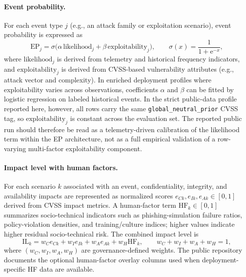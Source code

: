 \documentclass[preprint,12pt]{elsarticle}
\begin{document}
\paragraph{Event probability.}
For each event type $j$ (e.g., an attack family or exploitation scenario), event probability is expressed as
\begin{equation}
  \mathrm{EP}_j =
    \sigma\!\bigl(\alpha\,\mathrm{likelihood}_j + \beta\,\mathrm{exploitability}_j\bigr),
  \qquad
  \sigma(x) = \frac{1}{1+\mathrm{e}^{-x}},
  \label{eq:ep}
\end{equation}
where $\mathrm{likelihood}_j$ is derived from telemetry and historical frequency indicators, and $\mathrm{exploitability}_j$ is derived from CVSS-based vulnerability attributes (e.g., attack vector and complexity). In enriched deployment profiles where exploitability varies across observations, coefficients $\alpha$ and $\beta$ can be fitted by logistic regression on labeled historical events. In the strict public-data profile reported here, however, all rows carry the same \texttt{global\_neutral\_prior} CVSS tag, so $\mathrm{exploitability}_j$ is constant across the evaluation set. The reported public run should therefore be read as a telemetry-driven calibration of the likelihood term within the EP architecture, not as a full empirical validation of a row-varying multi-factor exploitability component.

\paragraph{Impact level with human factors.}
For each scenario $k$ associated with an event, confidentiality, integrity, and availability impacts are represented as normalized scores $e_{Ck}, e_{Ik}, e_{Ak} \in [0,1]$ derived from CVSS impact metrics. A human-factor term $\mathrm{HF}_k \in [0,1]$ summarizes socio-technical indicators such as phishing-simulation failure ratios, policy-violation densities, and training/culture indices; higher values indicate higher residual socio-technical risk. The combined impact level is
\begin{equation}
  \mathrm{IL}_k =
      w_C e_{Ck} + w_I e_{Ik} + w_A e_{Ak} + w_H \mathrm{HF}_k,
  \qquad
  w_C + w_I + w_A + w_H = 1,
  \label{eq:il}
\end{equation}
where $(w_C,w_I,w_A,w_H)$ are governance-defined weights. The public repository documents the optional human-factor overlay columns used when deployment-specific HF data are available.
\end{document}
